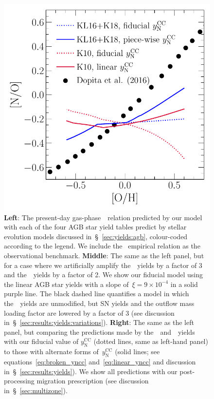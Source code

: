 \documentclass[ms.tex]{subfiles}
\begin{document}
\begin{figure}
\includegraphics[scale = 0.45]{no_oh_predictions_karakas.pdf}
\caption{
\textbf{Left}: The present-day gas-phase~\ohno~relation predicted by our
model with each of the four AGB star yield tables predict by stellar evolution
models discussed in~\S~\ref{sec:yields:agb}, colour-coded according to the
legend.
We include the~\citet{Dopita2016} empirical relation as the observational
benchmark.
\textbf{Middle}: The same as the left panel, but for a case where we
artificially amplify the~\cristallo~yields by a factor of 3 and
the~\ventura~yields by a factor of 2.
We show our fiducial model using the linear AGB star yields with a slope
of~$\xi = 9\times10^{-4}$ in a solid purple line.
The black dashed line quantifies a model in which the~\cristallo~yields are
unmodified, but SN yields and the outflow mass loading factor are lowered by a
factor of 3 (see discussion in~\S~\ref{sec:results:yields:variations}).
\textbf{Right}: The same as the left panel, but comparing the predictions made
by the~\karakasten~and~\karakas~yields with our fiducial value of
$y_\text{N}^\text{CC}$ (dotted lines, same as left-hand panel) to those with
alternate forms of~$y_\text{N}^\text{CC}$ (solid lines; see
equations~\ref{eq:broken_yncc} and~\ref{eq:linear_yncc} and discussion
in~\S~\ref{sec:results:yields}).
We show all predictions with our post-processing migration prescription (see
discussion in~\S~\ref{sec:multizone}).
}
\label{fig:no_oh_predictions}
\end{figure}
\end{document}
